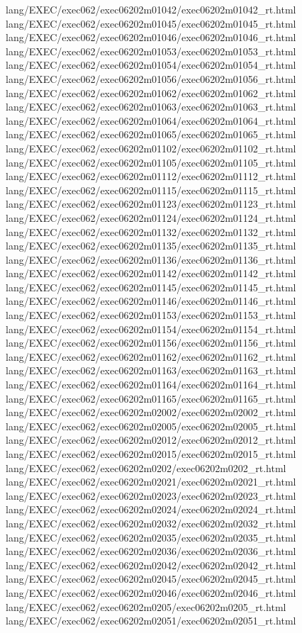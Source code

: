 lang/EXEC/exec062/exec06202m01042/exec06202m01042_rt.html
lang/EXEC/exec062/exec06202m01045/exec06202m01045_rt.html
lang/EXEC/exec062/exec06202m01046/exec06202m01046_rt.html
lang/EXEC/exec062/exec06202m01053/exec06202m01053_rt.html
lang/EXEC/exec062/exec06202m01054/exec06202m01054_rt.html
lang/EXEC/exec062/exec06202m01056/exec06202m01056_rt.html
lang/EXEC/exec062/exec06202m01062/exec06202m01062_rt.html
lang/EXEC/exec062/exec06202m01063/exec06202m01063_rt.html
lang/EXEC/exec062/exec06202m01064/exec06202m01064_rt.html
lang/EXEC/exec062/exec06202m01065/exec06202m01065_rt.html
lang/EXEC/exec062/exec06202m01102/exec06202m01102_rt.html
lang/EXEC/exec062/exec06202m01105/exec06202m01105_rt.html
lang/EXEC/exec062/exec06202m01112/exec06202m01112_rt.html
lang/EXEC/exec062/exec06202m01115/exec06202m01115_rt.html
lang/EXEC/exec062/exec06202m01123/exec06202m01123_rt.html
lang/EXEC/exec062/exec06202m01124/exec06202m01124_rt.html
lang/EXEC/exec062/exec06202m01132/exec06202m01132_rt.html
lang/EXEC/exec062/exec06202m01135/exec06202m01135_rt.html
lang/EXEC/exec062/exec06202m01136/exec06202m01136_rt.html
lang/EXEC/exec062/exec06202m01142/exec06202m01142_rt.html
lang/EXEC/exec062/exec06202m01145/exec06202m01145_rt.html
lang/EXEC/exec062/exec06202m01146/exec06202m01146_rt.html
lang/EXEC/exec062/exec06202m01153/exec06202m01153_rt.html
lang/EXEC/exec062/exec06202m01154/exec06202m01154_rt.html
lang/EXEC/exec062/exec06202m01156/exec06202m01156_rt.html
lang/EXEC/exec062/exec06202m01162/exec06202m01162_rt.html
lang/EXEC/exec062/exec06202m01163/exec06202m01163_rt.html
lang/EXEC/exec062/exec06202m01164/exec06202m01164_rt.html
lang/EXEC/exec062/exec06202m01165/exec06202m01165_rt.html
lang/EXEC/exec062/exec06202m02002/exec06202m02002_rt.html
lang/EXEC/exec062/exec06202m02005/exec06202m02005_rt.html
lang/EXEC/exec062/exec06202m02012/exec06202m02012_rt.html
lang/EXEC/exec062/exec06202m02015/exec06202m02015_rt.html
lang/EXEC/exec062/exec06202m0202/exec06202m0202_rt.html
lang/EXEC/exec062/exec06202m02021/exec06202m02021_rt.html
lang/EXEC/exec062/exec06202m02023/exec06202m02023_rt.html
lang/EXEC/exec062/exec06202m02024/exec06202m02024_rt.html
lang/EXEC/exec062/exec06202m02032/exec06202m02032_rt.html
lang/EXEC/exec062/exec06202m02035/exec06202m02035_rt.html
lang/EXEC/exec062/exec06202m02036/exec06202m02036_rt.html
lang/EXEC/exec062/exec06202m02042/exec06202m02042_rt.html
lang/EXEC/exec062/exec06202m02045/exec06202m02045_rt.html
lang/EXEC/exec062/exec06202m02046/exec06202m02046_rt.html
lang/EXEC/exec062/exec06202m0205/exec06202m0205_rt.html
lang/EXEC/exec062/exec06202m02051/exec06202m02051_rt.html
